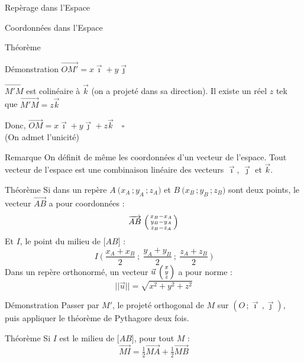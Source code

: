 \documentclass{cours}
\begin{document}
\begin{Gpartie}{Repèrage dans l'Espace}
\begin{Spartie}{Coordonnées dans l'Espace}
\begin{SSpartie}{Théorème}
\begin{SSSpartie}{Démonstration}
                    $\overrightarrow{OM'}=x\vec{\imath}+y\vec{\jmath}$

                    $\overrightarrow{M'M}$ est colinéaire à $\vec{k}$ (on a projeté dans sa direction). Il existe un réel $z$ tek que $\overrightarrow{M'M}=z\vec{k}$

                    Donc, $\overrightarrow{OM}=x\vec{\imath}+y\vec{\jmath}+z\vec{k}\quad\square$ \\
                    (On admet l'unicité)
                \end{SSSpartie}
                \begin{SSSpartie}{Remarque} 
                    On définit de même les coordonnées d'un vecteur de l'espace. Tout vecteur de l'espace est une combinaison linéaire des vecteurs $\vec{\imath}$, $\vec{\jmath}$ et $\vec{k}$.
                \end{SSSpartie}
            \end{SSpartie}
            \begin{SSpartie}{Théorème} 
                Si dans un repère $A~\big(x_A\,; y_A\,; z_A\big)$ et $B~\big(x_B\,; y_B\,; z_B\big)$ sont deux points, le vecteur $\overrightarrow{AB}$ a pour coordonnées : 
                \[\overrightarrow{AB}~\begin{psmallmatrix} x_B-x_A \\ y_B-y_A \\ z_B-z_A \end{psmallmatrix}\]
                Et $I$, le point du milieu de $\big[AB\big]$ :
                \[I~\Bigg(~\frac{x_A+x_B}{2}~;~\frac{y_A+y_B}{2}~;~\frac{z_A+z_B}{2}~\Bigg)\]
                Dans un repère orthonormé, un vecteur $\vec{u}~\begin{psmallmatrix}x \\ y \\ z\end{psmallmatrix}$ a pour norme :
                \[\lvert\lvert\vec{u}\rvert\rvert=\sqrt{x^2+y^2+z^2}\]
                \begin{SSSpartie}{Démonstration} 
                    Passer par $M'$, le projeté orthogonal de $M$ sur $\left(O\,;\vec{\imath}\,,\vec{\jmath}\right)$, puis appliquer le théorème de Pythagore deux fois.
                \end{SSSpartie}
            \end{SSpartie}
            \begin{SSpartie}{Théorème} 
                Si $I$ est le milieu de $\big[AB\big]$, pour tout $M$ :
                \[\overrightarrow{MI}=\tfrac{1}{2}\overrightarrow{MA}+\tfrac{1}{2}\overrightarrow{MB}\]

\end{SSpartie}
\end{Spartie}
\end{Gpartie}
\end{document}
